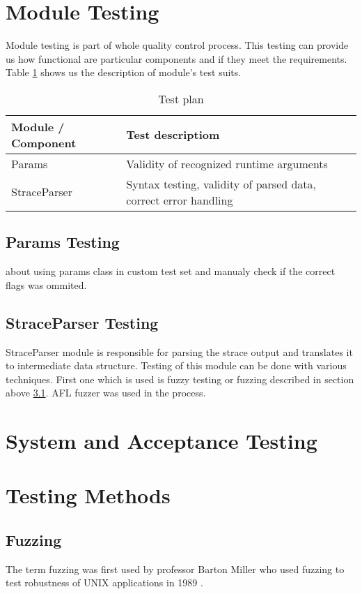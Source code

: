 \section{Module Testing}
Module testing is part of whole quality control process.
This testing can provide us how functional are particular components and if they meet the requirements.
Table \ref{table:moduletesting} shows us the description of module's test suits.

\begin{table}[h]
	\centering
	\begin{tabular}{|l|p{10cm}|}
		\hline
		\textbf{Module / Component}	&	\textbf{Test descriptiom} \\ \hline
		Params 											& Validity of recognized runtime arguments \\ \hline
		StraceParser								& Syntax testing, validity of parsed data, correct error handling \\ \hline
	\end{tabular}
	\caption{Test plan}
	\label{table:moduletesting}
\end{table}

\subsection{Params Testing}
about using params class in custom test set and manualy check if the correct flags was ommited.

\subsection{StraceParser Testing}
StraceParser module is responsible for parsing the strace output and translates it to intermediate data structure.
Testing of this module can be done with various techniques.
First one which is used is fuzzy testing or fuzzing described in section above \ref{fuzzing}.
AFL fuzzer was used in the process.

\section{System and Acceptance Testing}

\section{Testing Methods}
\subsection{Fuzzing}
\label{fuzzing}
The term fuzzing was first used by professor Barton Miller who used fuzzing to test robustness of UNIX applications in 1989 \cite{Takanen:2008:FSS:1404500}\cite{Marhefka2013}.
